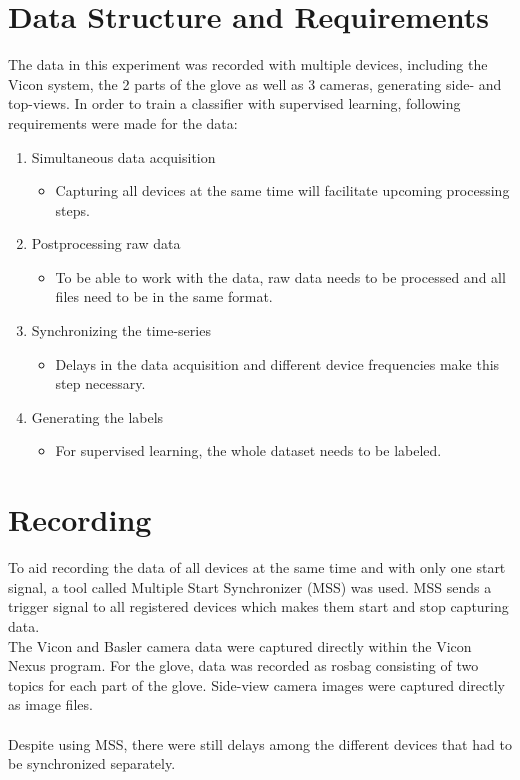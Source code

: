 \section{Data Structure and Requirements}
The data in this experiment was recorded with multiple devices, including the Vicon system, the 2 parts of the glove as well as 3 cameras, generating side- and top-views. In order to train a classifier with supervised learning, following requirements were made for the data:
\begin{enumerate}
\item Simultaneous data acquisition
\begin{itemize}
\item Capturing all devices at the same time will facilitate upcoming processing steps.
\end{itemize}
\item Postprocessing raw data
\begin{itemize}
\item To be able to work with the data, raw data needs to be processed and all files need to be in the same format.
\end{itemize}
\item Synchronizing the time-series
\begin{itemize}
\item Delays in the data acquisition and different device frequencies make this step necessary.
\end{itemize}
\item Generating the labels
\begin{itemize}
\item For supervised learning, the whole dataset needs to be labeled.
\end{itemize}
\end{enumerate}
\section{Recording} \label{recording}
To aid recording the data of all devices at the same time and with only one start signal, a tool called Multiple Start Synchronizer (MSS) was used. MSS sends a trigger signal to all registered devices which makes them start and stop capturing data.\\
The Vicon and Basler camera data were captured directly within the Vicon Nexus program. For the glove, data was recorded as rosbag consisting of two topics for each part of the glove. Side-view camera images were captured directly as image files.\\
\\
Despite using MSS, there were still delays among the different devices that had to be synchronized separately. 
